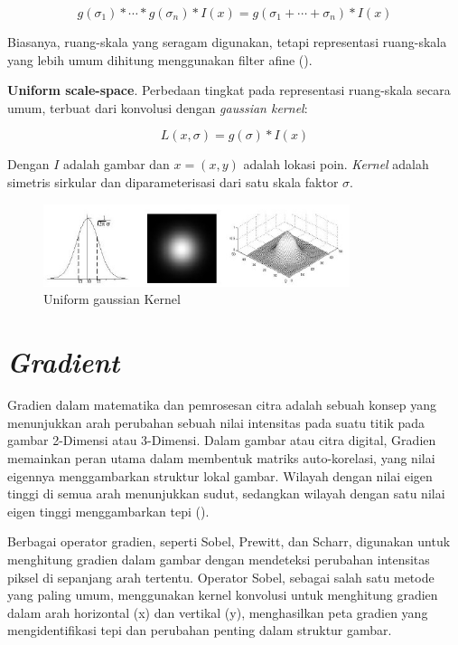 \begin{equation*}
g(\sigma_{1}) * \cdots * g(\sigma_{n}) * I(x) = g(\sigma_{1} + \cdots + \sigma_{n}) * I(x)
\end{equation*}

Biasanya, ruang-skala yang seragam digunakan, tetapi representasi ruang-skala yang lebih umum dihitung menggunakan filter afine (\cite[hlm. 14--15]{mikolajczyk:tel-00584096}).

\textbf{Uniform scale-space}. Perbedaan tingkat pada representasi ruang-skala secara umum, terbuat dari konvolusi dengan \emph{gaussian kernel}:

\begin{equation}
L(x,\sigma) = g(\sigma) * I(x)
\label{eq:konvolusi}
\end{equation}

Dengan \(I\) adalah gambar dan \(x = (x,y)\) adalah lokasi poin.
\emph{Kernel} adalah simetris sirkular dan diparameterisasi dari satu skala faktor \(\sigma \).

\begin{figure}
  \centering{}
  \includegraphics[width=0.8\textwidth]{gambar/Uniform Gaussian kernel.jpg}
  \caption{Uniform gaussian Kernel}
\end{figure}

\section{\emph{Gradient}}
  Gradien dalam matematika dan pemrosesan citra adalah sebuah konsep yang menunjukkan arah perubahan sebuah nilai intensitas pada suatu titik pada gambar 2-Dimensi atau 3-Dimensi. 
Dalam gambar atau citra digital, Gradien memainkan peran utama dalam membentuk matriks auto-korelasi, yang nilai eigennya menggambarkan struktur lokal gambar. 
Wilayah dengan nilai eigen tinggi di semua arah menunjukkan sudut, sedangkan wilayah dengan satu nilai eigen tinggi menggambarkan tepi (\cite[hlm. 305--306]{Sanchez2018}).

  Berbagai operator gradien, seperti Sobel, Prewitt, dan Scharr, digunakan untuk menghitung gradien dalam gambar dengan mendeteksi perubahan intensitas piksel di sepanjang arah tertentu. 
Operator Sobel, sebagai salah satu metode yang paling umum, menggunakan kernel konvolusi untuk menghitung gradien dalam arah horizontal (x) dan vertikal (y), menghasilkan peta gradien yang mengidentifikasi tepi dan perubahan penting dalam struktur gambar.
